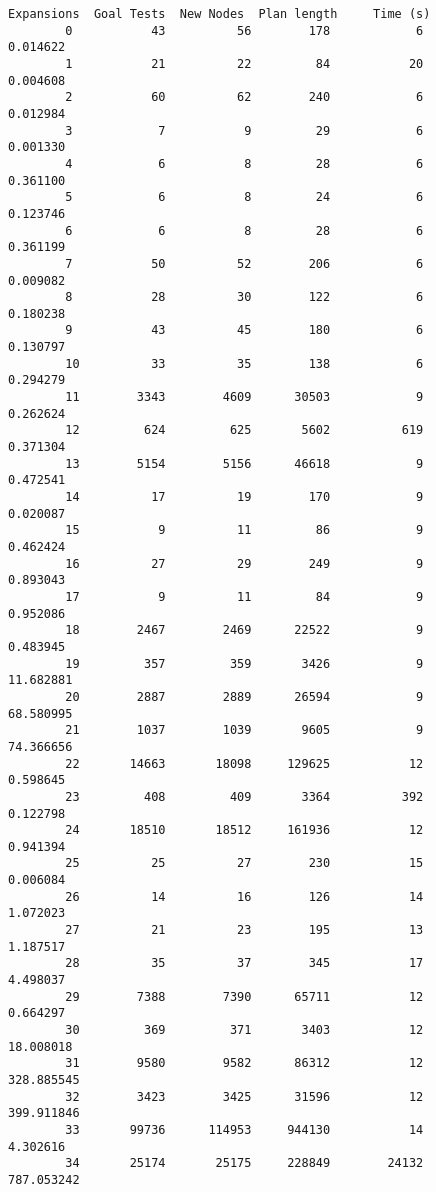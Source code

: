 \documentclass[11pt]{article}
\begin{document}
\begin{Verbatim}[commandchars=\\\{\}]
            Expansions  Goal Tests  New Nodes  Plan length     Time (s)  
        0           43          56        178            6     0.014622  
        1           21          22         84           20     0.004608  
        2           60          62        240            6     0.012984  
        3            7           9         29            6     0.001330  
        4            6           8         28            6     0.361100  
        5            6           8         24            6     0.123746  
        6            6           8         28            6     0.361199  
        7           50          52        206            6     0.009082  
        8           28          30        122            6     0.180238  
        9           43          45        180            6     0.130797  
        10          33          35        138            6     0.294279  
        11        3343        4609      30503            9     0.262624  
        12         624         625       5602          619     0.371304  
        13        5154        5156      46618            9     0.472541  
        14          17          19        170            9     0.020087  
        15           9          11         86            9     0.462424  
        16          27          29        249            9     0.893043  
        17           9          11         84            9     0.952086  
        18        2467        2469      22522            9     0.483945  
        19         357         359       3426            9    11.682881  
        20        2887        2889      26594            9    68.580995  
        21        1037        1039       9605            9    74.366656  
        22       14663       18098     129625           12     0.598645  
        23         408         409       3364          392     0.122798  
        24       18510       18512     161936           12     0.941394  
        25          25          27        230           15     0.006084  
        26          14          16        126           14     1.072023  
        27          21          23        195           13     1.187517  
        28          35          37        345           17     4.498037  
        29        7388        7390      65711           12     0.664297  
        30         369         371       3403           12    18.008018  
        31        9580        9582      86312           12   328.885545  
        32        3423        3425      31596           12   399.911846  
        33       99736      114953     944130           14     4.302616  
        34       25174       25175     228849        24132   787.053242  

\end{Verbatim}
\end{document}
